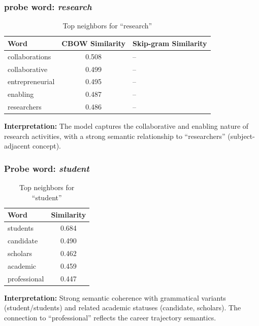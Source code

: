 \documentclass[11pt,a4paper]{report}
\begin{document}
\subsubsection{probe word: \textit{research}}
\begin{table}[H]
    \centering
    \begin{tabular}{lc}
        \toprule
        \textbf{Word} & \textbf{CBOW Similarity} & \textbf{Skip-gram Similarity} \\
        \midrule
        collaborations & 0.508 & -- \\
        collaborative & 0.499 & -- \\
        entrepreneurial & 0.495 & -- \\
        enabling & 0.487 & -- \\
        researchers & 0.486 & -- \\
        \bottomrule
    \end{tabular}
    \caption{Top neighbors for ``research''}
\end{table}

\textbf{Interpretation:} The model captures the collaborative and enabling nature of research activities, with a strong semantic relationship to ``researchers'' (subject-adjacent concept).

\subsubsection{Probe word: \textit{student}}
\begin{table}[H]
    \centering
    \begin{tabular}{lc}
        \toprule
        \textbf{Word} & \textbf{Similarity} \\
        \midrule
        students & 0.684 \\
        candidate & 0.490 \\
        scholars & 0.462 \\
        academic & 0.459 \\
        professional & 0.447 \\
        \bottomrule
    \end{tabular}
    \caption{Top neighbors for ``student''}
\end{table}

\textbf{Interpretation:} Strong semantic coherence with grammatical variants (student/students) and related academic statuses (candidate, scholars). The connection to ``professional'' reflects the career trajectory semantics.
\end{document}
